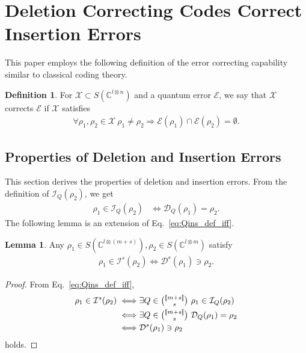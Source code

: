 \documentclass[reprint,amsmath,amssymb,aps,]{revtex4-2}
\theoremstyle{definition}
\newtheorem{defi}{Definition}
\newtheorem{lem}{Lemma}
\newcommand{\SET}[1]{\mathbb{#1}}
\newcommand{\C}{\SET{C}}
\newcommand{\1}{\mbox{1}\hspace{-0.25em}\mbox{l}}%
\newcommand{\setint}[1]{[\hspace{-0.5mm}[#1]\hspace{-0.5mm}]}
\newcommand{\subint}[2]{\tbinom{\setint{#1}}{#2}}
\newcommand{\pure}[2]{\C^{#1 \otimes #2}}
\newcommand{\state}[2]{S(\pure{#1}{#2})}
\newcommand{\QU}[1]{\mathcal{#1}}
\begin{document}
\section{Deletion Correcting Codes Correct Insertion Errors}
\label{sub:relat_indel_correct}
This paper employs the following definition of the error correcting capability
similar to classical coding theory.

\begin{defi}
  \label{def:error_corrct}
  For $\QU{X} \subset \state{l}{n}$ and a quantum error $\QU{E}$,
  we say that $\QU{X}$ corrects $\QU{E}$
  if $\QU{X}$ satisfies
  \begin{align*}
    \forall
    \rho_1, \rho_2
    \in
    \QU{X}
    ~
    \rho_1 \neq \rho_2
    \Rightarrow
    \QU{E}(\rho_1)
    \cap
    \QU{E}(\rho_2)
    =
    \emptyset.
  \end{align*}
\end{defi}

\subsection{Properties of Deletion and Insertion Errors}
\label{subsec:prop_indel}
This section derives the properties of deletion and insertion errors.
From the definition of $\QU{I}_Q(\rho_2)$,
we get
\begin{align}
  \rho_1 \in \QU{I}_Q(\rho_2)
  &\iff
  \QU{D}_Q(\rho_1) = \rho_2.
  \label{eq:Qins_def_iff}
\end{align}
The following lemma is
an extension of Eq.~\eqref{eq:Qins_def_iff}.

\begin{lem}
  \label{lem:sins_iff_sdel}
  Any $\rho_1 \in \state{l}{(m+s)}, \rho_2 \in \state{l}{m}$ satisfy
  \begin{align*}
    \rho_1 \in \QU{I}^s(\rho_2)
    \iff
    \QU{D}^s(\rho_1) \ni \rho_2.
  \end{align*}
\end{lem}

\begin{proof}
  From Eq.~\eqref{eq:Qins_def_iff},
  \begin{align*}
    \rho_1 \in \QU{I}^s(\rho_2)
    \iff&
    \exists Q \in \subint{m+s}{s}
    ~
    \rho_1 \in \QU{I}_Q(\rho_2)\\
    \iff&
    \exists Q \in \subint{m+s}{s}
    ~
    \QU{D}_Q(\rho_1) = \rho_2\\
    \iff&
    \QU{D}^s(\rho_1) \ni \rho_2
  \end{align*}
  holds.
\end{proof}
\end{document}
